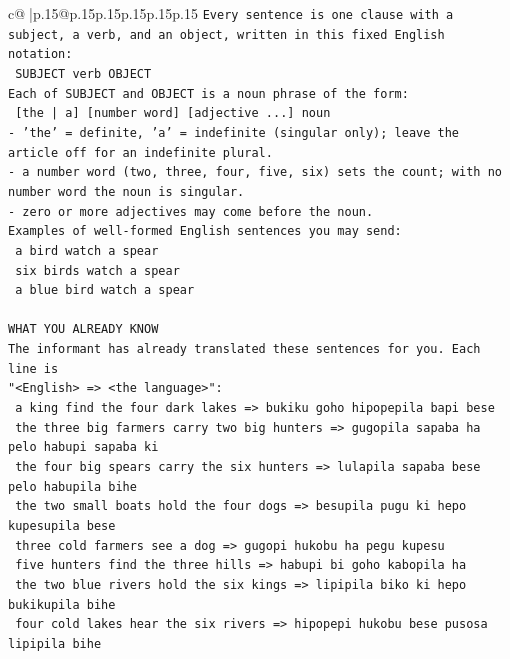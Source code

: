 \documentclass{article}
\begin{document}
{\begin{supertabular}{c@{$\;$}|p{.15\linewidth}@{}p{.15\linewidth}p{.15\linewidth}p{.15\linewidth}p{.15\linewidth}p{.15\linewidth}}
{{{\texttt{Every sentence is one clause with a subject, a verb, and an object, written in this fixed English notation:} \\
\texttt{    SUBJECT  verb  OBJECT} \\
\texttt{Each of SUBJECT and OBJECT is a noun phrase of the form:} \\
\texttt{    {[}the | a{]}  {[}number word{]}  {[}adjective ...{]}  noun} \\
\texttt{{-} 'the' = definite, 'a' = indefinite (singular only); leave the article off for an indefinite plural.} \\
\texttt{{-} a number word (two, three, four, five, six) sets the count; with no number word the noun is singular.} \\
\texttt{{-} zero or more adjectives may come before the noun.} \\
\texttt{Examples of well{-}formed English sentences you may send:} \\
\texttt{    a bird watch a spear} \\
\texttt{    six birds watch a spear} \\
\texttt{    a blue bird watch a spear} \\
\\ 
\texttt{WHAT YOU ALREADY KNOW} \\
\texttt{The informant has already translated these sentences for you. Each line is} \\
\texttt{"<English>  =>  <the language>":} \\
\texttt{    a king find the four dark lakes  =>  bukiku goho hipopepila bapi bese} \\
\texttt{    the three big farmers carry two big hunters  =>  gugopila sapaba ha pelo habupi sapaba ki} \\
\texttt{    the four big spears carry the six hunters  =>  lulapila sapaba bese pelo habupila bihe} \\
\texttt{    the two small boats hold the four dogs  =>  besupila pugu ki hepo kupesupila bese} \\
\texttt{    three cold farmers see a dog  =>  gugopi hukobu ha pegu kupesu} \\
\texttt{    five hunters find the three hills  =>  habupi bi goho kabopila ha} \\
\texttt{    the two blue rivers hold the six kings  =>  lipipila biko ki hepo bukikupila bihe} \\
\texttt{    four cold lakes hear the six rivers  =>  hipopepi hukobu bese pusosa lipipila bihe} \\
}}}
\end{supertabular}}
\end{document}
